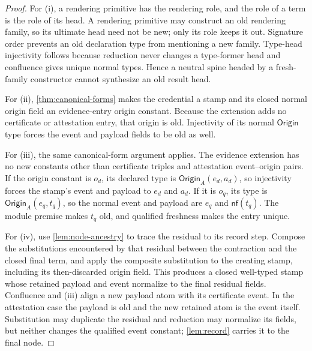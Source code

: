\documentclass[11pt]{article}
\numberwithin{equation}{section}
\theoremstyle{definition}
\theoremstyle{plain}
\theoremstyle{remark}
\newcommand{\Origin}{\mathsf{Origin}}
\newcommand{\nf}{\mathsf{nf}}
\begin{document}
\begin{proof}
For (i), a rendering primitive has the rendering role, and the role of a
term is the role of its head.  A rendering primitive may construct an old
rendering family, so its ultimate head need not be new; only its role keeps
it out.  Signature order prevents an old declaration type from mentioning a
new family.  Type-head injectivity follows because reduction never changes a
type-former head and confluence gives unique normal types.  Hence a neutral
spine headed by a fresh-family constructor cannot synthesize an old result
head.

For (ii), \cref{thm:canonical-forms} makes the credential a stamp and its
closed normal origin field an evidence-entry origin constant.  Because the
extension adds no certificate or attestation entry, that origin is old.
Injectivity of its normal \(\Origin\) type forces the event and payload fields
to be old as well.

For (iii), the same canonical-form argument applies.  The evidence extension
has no new constants other than certificate triples and attestation
event--origin pairs.  If the origin constant is \(o_d\), its declared type is
\(\Origin_A(e_d,a_d)\), so injectivity forces the stamp's event and payload
to \(e_d\) and \(a_d\).  If it is \(o_q\), its type is
\(\Origin_A(e_q,t_q)\), so the normal event and payload are \(e_q\) and
\(\nf(t_q)\).  The module premise makes \(t_q\) old, and qualified freshness
makes the entry unique.

For (iv), use \cref{lem:node-ancestry} to trace the residual to its record
step.  Compose the substitutions encountered by that residual between the
contraction and the closed final term, and apply the composite substitution to
the creating stamp, including its then-discarded origin field.  This produces
a closed well-typed stamp whose retained payload and event normalize to the
final residual fields.  Confluence and (iii) align a new payload atom with its
certificate event.  In the attestation case the payload is old and the new
retained atom is the event itself.  Substitution may duplicate the residual
and reduction may normalize its fields, but neither changes the qualified
event constant; \cref{lem:record} carries it to the final node.
\end{proof}
\end{document}
